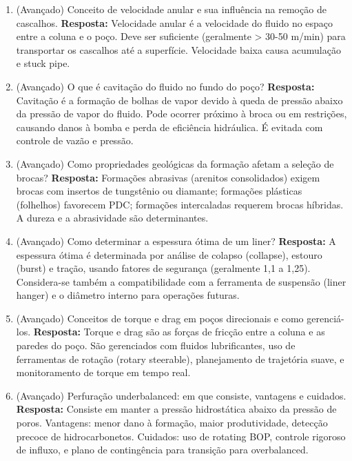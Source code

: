 \documentclass[11pt,a4paper]{article}
\begin{document}
\begin{enumerate}
  \item (Avançado) Conceito de velocidade anular e sua influência na remoção de cascalhos.
  \textbf{Resposta:} Velocidade anular é a velocidade do fluido no espaço entre a coluna e o poço. Deve ser suficiente (geralmente > 30-50 m/min) para transportar os cascalhos até a superfície. Velocidade baixa causa acumulação e stuck pipe.

  \item (Avançado) O que é cavitação do fluido no fundo do poço?
  \textbf{Resposta:} Cavitação é a formação de bolhas de vapor devido à queda de pressão abaixo da pressão de vapor do fluido. Pode ocorrer próximo à broca ou em restrições, causando danos à bomba e perda de eficiência hidráulica. É evitada com controle de vazão e pressão.

  \item (Avançado) Como propriedades geológicas da formação afetam a seleção de brocas?
  \textbf{Resposta:} Formações abrasivas (arenitos consolidados) exigem brocas com insertos de tungstênio ou diamante; formações plásticas (folhelhos) favorecem PDC; formações intercaladas requerem brocas híbridas. A dureza e a abrasividade são determinantes.

  \item (Avançado) Como determinar a espessura ótima de um liner?
  \textbf{Resposta:} A espessura ótima é determinada por análise de colapso (collapse), estouro (burst) e tração, usando fatores de segurança (geralmente 1,1 a 1,25). Considera-se também a compatibilidade com a ferramenta de suspensão (liner hanger) e o diâmetro interno para operações futuras.

  \item (Avançado) Conceitos de torque e drag em poços direcionais e como gerenciá-los.
  \textbf{Resposta:} Torque e drag são as forças de fricção entre a coluna e as paredes do poço. São gerenciados com fluidos lubrificantes, uso de ferramentas de rotação (rotary steerable), planejamento de trajetória suave, e monitoramento de torque em tempo real.

  \item (Avançado) Perfuração underbalanced: em que consiste, vantagens e cuidados.
  \textbf{Resposta:} Consiste em manter a pressão hidrostática abaixo da pressão de poros. Vantagens: menor dano à formação, maior produtividade, detecção precoce de hidrocarbonetos. Cuidados: uso de rotating BOP, controle rigoroso de influxo, e plano de contingência para transição para overbalanced.


\end{enumerate}
\end{document}
